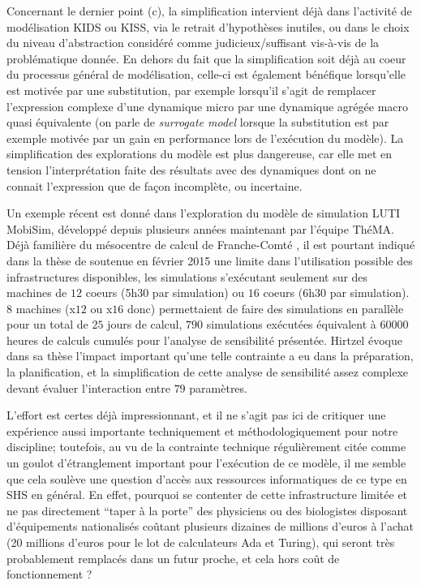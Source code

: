 Concernant le dernier point (c), la simplification intervient déjà dans l'activité de modélisation KIDS ou KISS, via le retrait d'hypothèses inutiles, ou dans le choix du niveau d'abstraction considéré comme judicieux/suffisant vis-à-vis de la problématique donnée. En dehors du fait que la simplification soit déjà au coeur du processus général de modélisation, celle-ci est également bénéfique lorsqu'elle est motivée par une substitution, par exemple lorsqu'il s'agit de remplacer l'expression complexe d'une dynamique micro par une dynamique agrégée macro quasi équivalente (on parle de \textit{surrogate model} lorsque la substitution est par exemple motivée par un gain en performance lors de l'exécution du modèle). La simplification des explorations du modèle est plus dangereuse, car elle met en tension l'interprétation faite des résultats avec des dynamiques dont on ne connait l'expression que de façon incomplète, ou incertaine.

Un exemple récent est donné dans l'exploration du modèle de simulation LUTI MobiSim, développé depuis plusieurs années maintenant par l'équipe ThéMA. Déjà familière du mésocentre de calcul de Franche-Comté \autocite{Asch2012}, il est pourtant indiqué dans la thèse de \textcite{Hirtzel2015} soutenue en février 2015 une limite dans l'utilisation possible des infrastructures disponibles, les simulations s'exécutant seulement sur des machines de $12$ coeurs (5h30 par simulation) ou $16$ coeurs (6h30 par simulation). $8$ machines (x$12$ ou x$16$ donc) permettaient de faire des simulations en parallèle pour un total de $25$ jours de calcul, $790$ simulations exécutées équivalent à $\num{60000}$ heures de calculs cumulés pour l'analyse de sensibilité présentée. Hirtzel évoque dans sa thèse l'impact important qu'une telle contrainte a eu dans la préparation, la planification, et la simplification de cette analyse de sensibilité assez complexe devant évaluer l'interaction entre $79$ paramètres. 

L'effort est certes déjà impressionnant, et il ne s'agit pas ici de critiquer une expérience aussi importante techniquement et méthodologiquement pour notre discipline; toutefois, au vu de la contrainte technique régulièrement citée comme un goulot d'étranglement important pour l'exécution de ce modèle, il me semble que cela soulève une question d'accès aux ressources informatiques de ce type en SHS en général. En effet, pourquoi se contenter de cette infrastructure limitée et ne pas directement \enquote{taper à la porte} des physiciens ou des biologistes disposant d'équipements nationalisés coûtant plusieurs dizaines de millions d'euros à l'achat (20 millions d'euros pour le lot de calculateurs Ada et Turing), qui seront très probablement remplacés dans un futur proche, et cela hors coût de fonctionnement ? 


